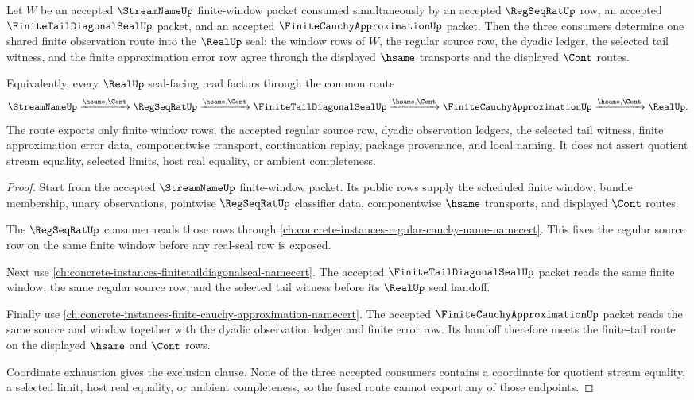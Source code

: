 \begin{theorem}
\label{thm:streamname-finite-window-diagonal-fusion}
Let $W$ be an accepted $\StreamNameUp$ finite-window packet consumed simultaneously by an accepted $\RegSeqRatUp$ row, an accepted $\FiniteTailDiagonalSealUp$ packet, and an accepted $\FiniteCauchyApproximationUp$ packet. Then the three consumers determine one shared finite observation route into the $\RealUp$ seal: the window rows of $W$, the regular source row, the dyadic ledger, the selected tail witness, and the finite approximation error row agree through the displayed $\hsame$ transports and the displayed $\Cont$ routes.

Equivalently, every $\RealUp$ seal-facing read factors through the common route
$$
\StreamNameUp
\xrightarrow{\hsame,\Cont}
\RegSeqRatUp
\xrightarrow{\hsame,\Cont}
\FiniteTailDiagonalSealUp
\xrightarrow{\hsame,\Cont}
\FiniteCauchyApproximationUp
\xrightarrow{\hsame,\Cont}
\RealUp.
$$
The route exports only finite window rows, the accepted regular source row, dyadic observation ledgers, the selected tail witness, finite approximation error data, componentwise transport, continuation replay, package provenance, and local naming. It does not assert quotient stream equality, selected limits, host real equality, or ambient completeness.
\end{theorem}
\begin{proof}
Start from the accepted $\StreamNameUp$ finite-window packet. Its public rows supply the scheduled finite window, bundle membership, unary observations, pointwise $\RegSeqRatUp$ classifier data, componentwise $\hsame$ transports, and displayed $\Cont$ routes.

The $\RegSeqRatUp$ consumer reads those rows through \autoref{ch:concrete-instances-regular-cauchy-name-namecert}. This fixes the regular source row on the same finite window before any real-seal row is exposed.

Next use \autoref{ch:concrete-instances-finitetaildiagonalseal-namecert}. The accepted $\FiniteTailDiagonalSealUp$ packet reads the same finite window, the same regular source row, and the selected tail witness before its $\RealUp$ seal handoff.

Finally use \autoref{ch:concrete-instances-finite-cauchy-approximation-namecert}. The accepted $\FiniteCauchyApproximationUp$ packet reads the same source and window together with the dyadic observation ledger and finite error row. Its handoff therefore meets the finite-tail route on the displayed $\hsame$ and $\Cont$ rows.

Coordinate exhaustion gives the exclusion clause. None of the three accepted consumers contains a coordinate for quotient stream equality, a selected limit, host real equality, or ambient completeness, so the fused route cannot export any of those endpoints.
\end{proof}


